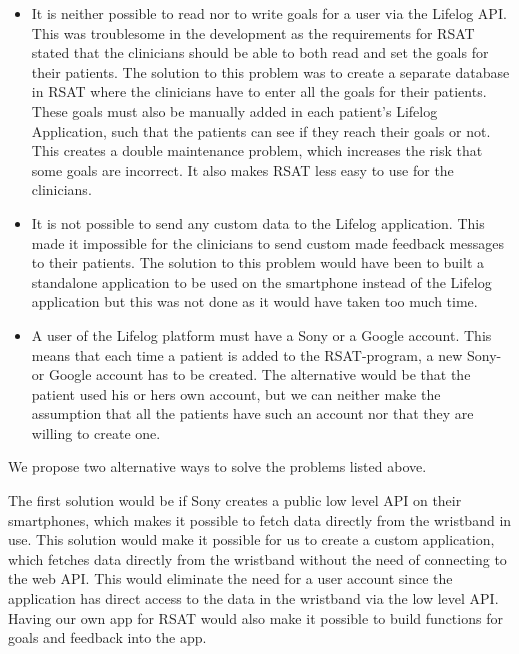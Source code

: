 \documentclass{cslthse-msc}
\begin{document}
\begin{itemize}

\item It is neither possible to read nor to write goals for a user via the Lifelog API. This was troublesome in the development as the requirements for RSAT stated that the clinicians should be able to both read and set the goals for their patients. The solution to this problem was to create a separate database in RSAT where the clinicians have to enter all the goals for their patients. These goals must also be manually added in each patient’s Lifelog Application, such that the patients can see if they reach their goals or not. This creates a double maintenance problem, which increases the risk that some goals are incorrect. It also makes RSAT less easy to use for the clinicians. 

\item It is not possible to send any custom data to the Lifelog application. This made it impossible for the clinicians to send custom made feedback messages to their patients. The solution to this problem would have been to built a standalone application to be used on the smartphone instead of the Lifelog application but this was not done as it would have taken too much time. 

\item A user of the Lifelog platform must have a Sony or a Google account. This means that each time a patient is added to the RSAT-program, a new Sony- or Google account has to be created. The alternative would be that the patient used his or hers own account, but we can neither make the assumption that all the patients have such an account nor that they are willing to create one. 

\end{itemize}

We propose two alternative ways to solve the problems listed above. 

The first solution would be if Sony creates a public low level API on their smartphones, which makes it possible to fetch data directly from the wristband in use. This solution would make it possible for us to create a custom application, which fetches data directly from the wristband without the need of connecting to the web API. This would eliminate the need for a user account since the application has direct access to the data in the wristband via the low level API. Having our own app for RSAT would also make it possible to build functions for goals and feedback into the app.
\end{document}
